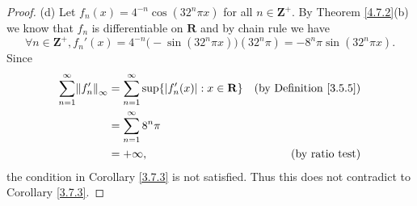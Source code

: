\begin{proof}{(d)}
    Let \(f_n(x) = 4^{-n} \cos(32^n \pi x)\) for all \(n \in \mathbf{Z}^+\).
    By Theorem \ref{4.7.2}(b) we know that \(f_n\) is differentiable on \(\mathbf{R}\) and by chain rule we have
    \[
        \forall n \in \mathbf{Z}^+, f_n'(x) = 4^{-n} \big(-\sin(32^n \pi x)\big) (32^n \pi) = - 8^n \pi \sin(32^n \pi x).
    \]
    Since
    \begin{align*}
        \sum_{n = 1}^\infty \norm*{f_n'}_\infty & = \sum_{n = 1}^\infty \sup\{\abs*{f_n'(x)} : x \in \mathbf{R}\} & \text{(by Definition \ref{3.5.5})} \\
                                                & = \sum_{n = 1}^\infty 8^n \pi                                                                        \\
                                                & = +\infty,                                                      & \text{(by ratio test)}
    \end{align*}
    the condition in Corollary \ref{3.7.3} is not satisfied.
    Thus this does not contradict to Corollary \ref{3.7.3}.
\end{proof}